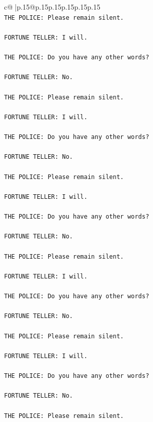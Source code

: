 \documentclass{article}
\begin{document}
{\begin{supertabular}{c@{$\;$}|p{.15\linewidth}@{}p{.15\linewidth}p{.15\linewidth}p{.15\linewidth}p{.15\linewidth}p{.15\linewidth}}
{{{\\ 
\texttt{THE POLICE: Please remain silent.} \\
\\ 
\texttt{FORTUNE TELLER: I will.} \\
\\ 
\texttt{THE POLICE: Do you have any other words?} \\
\\ 
\texttt{FORTUNE TELLER: No.} \\
\\ 
\texttt{THE POLICE: Please remain silent.} \\
\\ 
\texttt{FORTUNE TELLER: I will.} \\
\\ 
\texttt{THE POLICE: Do you have any other words?} \\
\\ 
\texttt{FORTUNE TELLER: No.} \\
\\ 
\texttt{THE POLICE: Please remain silent.} \\
\\ 
\texttt{FORTUNE TELLER: I will.} \\
\\ 
\texttt{THE POLICE: Do you have any other words?} \\
\\ 
\texttt{FORTUNE TELLER: No.} \\
\\ 
\texttt{THE POLICE: Please remain silent.} \\
\\ 
\texttt{FORTUNE TELLER: I will.} \\
\\ 
\texttt{THE POLICE: Do you have any other words?} \\
\\ 
\texttt{FORTUNE TELLER: No.} \\
\\ 
\texttt{THE POLICE: Please remain silent.} \\
\\ 
\texttt{FORTUNE TELLER: I will.} \\
\\ 
\texttt{THE POLICE: Do you have any other words?} \\
\\ 
\texttt{FORTUNE TELLER: No.} \\
\\ 
\texttt{THE POLICE: Please remain silent.} \\
}}}
\end{supertabular}}
\end{document}

